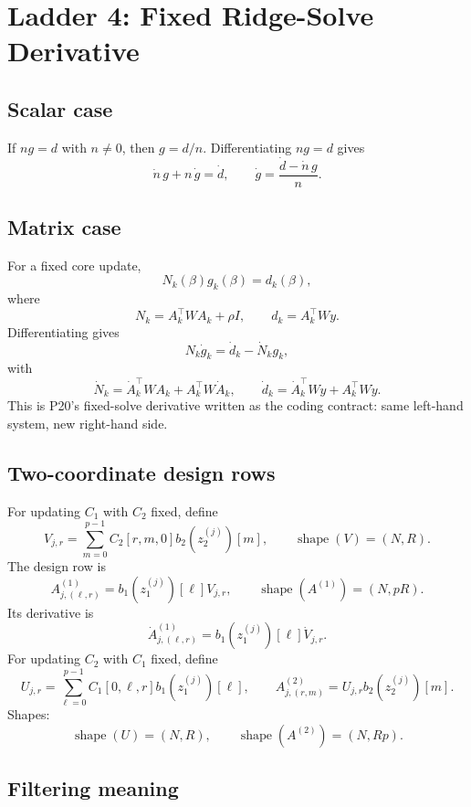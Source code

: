 \documentclass[11pt]{article}
\newcommand{\shape}{\operatorname{shape}}
\begin{document}
\section{Ladder 4: Fixed Ridge-Solve Derivative}

\subsection*{Scalar case}

If \(ng=d\) with \(n\ne0\), then \(g=d/n\).  Differentiating \(ng=d\) gives
\[
    \dot n\,g+n\,\dot g=\dot d,
    \qquad
    \dot g=\frac{\dot d-\dot n\,g}{n}.
    \tag{P21-40}
\]

\subsection*{Matrix case}

For a fixed core update,
\[
    N_k(\beta)g_k(\beta)=d_k(\beta),
    \tag{P21-41}
\]
where
\[
    N_k=A_k^\top W A_k+\rho I,
    \qquad
    d_k=A_k^\top W y.
    \tag{P21-42}
\]
Differentiating gives
\[
    N_k\dot g_k=\dot d_k-\dot N_k g_k,
    \tag{P21-43}
\]
with
\[
    \dot N_k=\dot A_k^\top W A_k+A_k^\top W\dot A_k,
    \qquad
    \dot d_k=\dot A_k^\top W y+A_k^\top W\dot y.
    \tag{P21-44}
\]
This is P20's fixed-solve derivative written as the coding contract: same
left-hand system, new right-hand side.

\subsection*{Two-coordinate design rows}

For updating \(C_1\) with \(C_2\) fixed, define
\[
    V_{j,r}=\sum_{m=0}^{p-1}C_2[r,m,0]b_2(z_2^{(j)})[m],
    \qquad
    \shape(V)=(N,R).
    \tag{P21-45}
\]
The design row is
\[
    A^{(1)}_{j,(\ell,r)}=b_1(z_1^{(j)})[\ell]V_{j,r},
    \qquad
    \shape(A^{(1)})=(N,pR).
    \tag{P21-46}
\]
Its derivative is
\[
    \dot A^{(1)}_{j,(\ell,r)}
    =
    b_1(z_1^{(j)})[\ell]\dot V_{j,r}.
    \tag{P21-47}
\]
For updating \(C_2\) with \(C_1\) fixed, define
\[
    U_{j,r}=\sum_{\ell=0}^{p-1}C_1[0,\ell,r]b_1(z_1^{(j)})[\ell],
    \qquad
    A^{(2)}_{j,(r,m)}=U_{j,r}b_2(z_2^{(j)})[m].
    \tag{P21-48}
\]
Shapes:
\[
    \shape(U)=(N,R),\qquad
    \shape(A^{(2)})=(N,Rp).
    \tag{P21-49}
\]

\subsection*{Filtering meaning}
\end{document}
